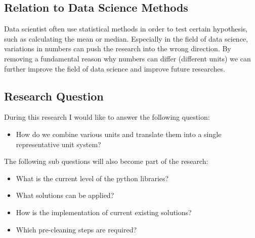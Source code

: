 \documentclass[sigchi, nonacm]{acmart}
\begin{document}
\subsection{Relation to Data Science Methods}
Data scientist often use statistical methods in order to test certain hypothesis, such as calculating the mean or median. Especially in the field of data science, variations in numbers can push the research into the wrong direction. By removing a fundamental reason why numbers can differ (different units) we can further improve the field of data science and improve future researches.

\subsection{Research Question}
During this research I would like to answer the following question:
\begin{itemize}
    \item{How do we combine various units and translate them into a single representative unit system?}
\end{itemize}

The following sub questions will also become part of the research:
\begin{itemize}
    \item{What is the current level of the python libraries?}
    \item{What solutions can be applied?}
    \item{How is the implementation of current existing solutions?}
    \item{Which pre-cleaning steps are required?}
\end{itemize}

\end{document}
